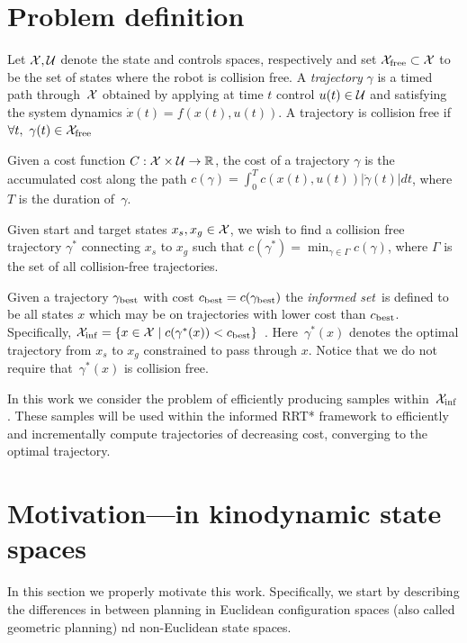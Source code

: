 \documentclass[letterpaper, 10 pt, conference]{ieeeconf}  %
\begin{document}
\section{Problem definition}
\label{sec:pdef}


Let $\mathcal{X}, \mathcal{U}$ denote the state and controls spaces, respectively and set $\mathcal{X}_{\rm free} \subset \mathcal{X}$ to be the set of states where the robot is collision free.
A \emph{trajectory} $\gamma$ is a timed path through~$\mathcal{X}$ obtained by applying at time $t$ control $u(t) \in \mathcal{U}$ and satisfying the system dynamics 
$\dot{x}(t) = f( x(t) , u(t) )$.
A trajectory is collision free if $\forall t,~\gamma(t) \in \mathcal{X}_{\rm free}$

Given a cost function $C : \mathcal{X} \times \mathcal{U} \rightarrow \mathbb{R}$, the cost of a trajectory $ \gamma $ is the accumulated cost along the path
$c(\gamma) = \int_0^{T} c( x(t), u(t) ) |\dot{\gamma}(t)|dt$, 
where $T$ is the duration of~$\gamma$.

Given start and target states $x_s, x_g \in \mathcal{X}$, we wish to find a collision free trajectory $\gamma^*$ connecting $x_s$ to $x_g$ such that 
$c(\gamma^*) = \min_{\gamma \in \Gamma} c(\gamma)$, where $\Gamma$ is the set of all collision-free trajectories.

Given a trajectory $\gamma_{\rm best}$ with cost $c_{\rm best} = c(\gamma_{\rm best})$ the \emph{informed set}~\Cinf is defined to be all states $x$  which may be on trajectories with lower cost than $c_{\rm best}$.
Specifically,
$
\mathcal{X}_{\rm {inf}} = \{ x \in \mathcal{X} \mid  
		c ( \gamma^*(x) ) < c_{\rm best} \} $~\cite{GSB14}.
Here~$ \gamma^*(x) $ denotes the optimal trajectory  from $ x_s $ to $ x_g $ constrained to pass through $ x $.
Notice that we do not require that~$ \gamma^*(x) $ is collision free.

In this work we consider the problem of efficiently producing samples within~$\mathcal{X}_{\rm {inf}}$.
These samples will be used within the informed RRT* framework to efficiently and incrementally compute trajectories of decreasing cost, converging to the optimal trajectory.


\section{Motivation---\Cinf in kinodynamic state spaces}
\label{sec:mtdi}

In this section we properly motivate this work.
Specifically, we start by describing the differences in between planning in Euclidean configuration spaces (also called geometric planning) nd non-Euclidean  state spaces.
\end{document}
